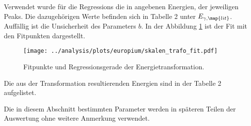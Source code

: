Verwendet wurde für die Regressions die in \cite{anleitungv18} angebenen Energien,
der jeweiligen Peaks. Die dazugehörigen Werte befinden sich in Tabelle 2 %
unter $E_{\gamma,\map{lit}}$.
Auffällig ist die Unsicherheit des Parameters $b$.
In der Abbildung \ref{fig:skalen_trafo_fit} ist der Fit mit den Fitpunkten dargestellt.
\begin{figure}
  \centering
  \texttt{[image: ../analysis/plots/europium/skalen\_trafo\_fit.pdf]}
  \caption{Fitpunkte und Regressionsgerade der Energietransformation.}
  \label{fig:skalen_trafo_fit}
\end{figure}
Die aus der Transformation resultierenden Energien sind in der Tabelle 2 %
aufgelistet.

Die in diesem Abschnitt bestimmten Parameter werden in späteren Teilen der Auswertung
ohne weitere Anmerkung verwendet.
\FloatBarrier

